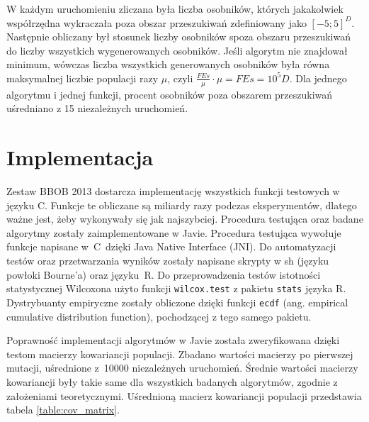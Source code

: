 \documentclass[a4paper,onecolumn,oneside,12pt,wide,floatssmall]{mwrep}
\theoremstyle{definition}
\theoremstyle{plain}%
\theoremstyle{remark}
\begin{document}
W każdym uruchomieniu zliczana była liczba osobników, których jakakolwiek współrzędna wykraczała poza
obszar przeszukiwań zdefiniowany jako $[-5; 5]^D$. Następnie obliczany był stosunek liczby 
osobników spoza obszaru przeszukiwań do liczby wszystkich wygenerowanych osobników. Jeśli algorytm
nie znajdował minimum, wówczas liczba wszystkich generowanych osobników była równa maksymalnej liczbie
populacji razy $\mu$, czyli $\frac{FEs}{\mu} \cdot \mu = FEs = 10^5D$. 
Dla jednego algorytmu i jednej funkcji, procent osobników
poza obszarem przeszukiwań uśredniano z 15 niezależnych uruchomień.

\section{Implementacja}

Zestaw BBOB 2013 dostarcza implementację wszystkich funkcji testowych w języku C. Funkcje te obliczane
są miliardy razy podczas eksperymentów, dlatego ważne jest, żeby wykonywały się jak najszybciej.
Procedura testująca oraz badane algorytmy zostały zaimplementowane w 
Javie. Procedura testująca wywołuje funkcje napisane w~C~dzięki Java Native Interface (JNI).
Do automatyzacji testów oraz przetwarzania wyników zostały napisane skrypty w sh 
(języku powłoki Bourne'a) oraz języku~R. Do przeprowadzenia testów istotności statystycznej Wilcoxona 
użyto funkcji \texttt{wilcox.test} z pakietu \texttt{stats} języka R. Dystrybuanty empiryczne
zostały obliczone dzięki funkcji \texttt{ecdf} (ang. empirical cumulative distribution function),
pochodzącej z tego samego pakietu.

Poprawność implementacji algorytmów w Javie została zweryfikowana dzięki testom macierzy kowariancji
populacji. Zbadano wartości macierzy po pierwszej mutacji, uśrednione z~10000 niezależnych uruchomień. 
Średnie wartości macierzy kowariancji były takie same dla wszystkich badanych algorytmów, zgodnie z 
założeniami teoretycznymi. Uśrednioną macierz kowariancji populacji przedstawia tabela 
\ref{table:cov_matrix}. 
\end{document}
